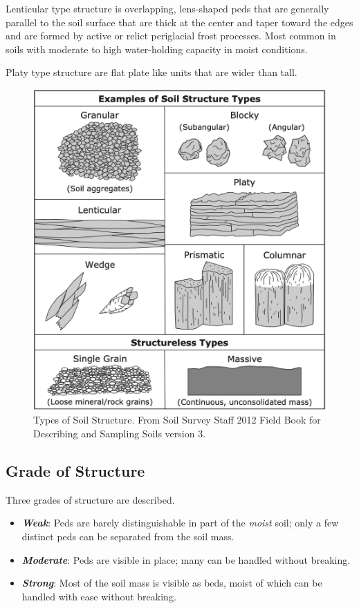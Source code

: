 \documentclass[a5paper]{book}
\begin{document}
Lenticular type structure is overlapping, lens-shaped peds that are  generally parallel to the soil surface that are thick at the center and taper toward the edges and are formed by active or relict periglacial frost processes. Most common in soils with moderate to high water-holding capacity in moist conditions.

Platy type structure are flat plate like units that are wider than tall.

\begin{figure}
    \centering
    \includegraphics[width=0.8\columnwidth]{images/FieldBookVer3_ExamplesSoilStructureTypes1045x1145.png}
    \caption{Types of Soil Structure. From Soil Survey Staff 2012 Field Book for Describing and Sampling Soils version 3.}
    \label{fig:SoilStructureTypes}
\end{figure}

\subsection{Grade of Structure}
    
Three grades of structure are described.

\begin{itemize}
    \item \textbf{\emph{Weak}}: Peds are barely distinguishable in part of the \emph{moist} soil; only a few distinct peds can be separated from the soil mass.
    \item \textbf{\emph{Moderate}}: Peds are visible in place; many can be handled without breaking.
    \item \textbf{\emph{Strong}}: Most of the soil mass is visible as beds, moist of which can be handled with ease without breaking.
\end{itemize}
\end{document}
